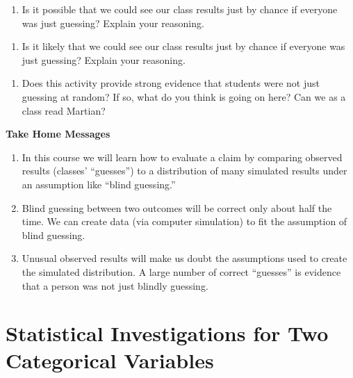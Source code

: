 \documentclass[
]{report}
\providecommand{\tightlist}{%
  \setlength{\itemsep}{0pt}\setlength{\parskip}{0pt}}
\begin{document}
\begin{enumerate}
\def\labelenumi{\arabic{enumi}.}
\setcounter{enumi}{15}
\tightlist
\item
  Is it possible that we could see our class results just by chance if everyone was just guessing? Explain your reasoning.
\end{enumerate}

\vspace{1in}

\begin{enumerate}
\def\labelenumi{\arabic{enumi}.}
\setcounter{enumi}{16}
\tightlist
\item
  Is it likely that we could see our class results just by chance if everyone was just guessing? Explain your reasoning.
\end{enumerate}

\vspace{1in}

\begin{enumerate}
\def\labelenumi{\arabic{enumi}.}
\setcounter{enumi}{17}
\tightlist
\item
  Does this activity provide strong evidence that students were not just guessing at random? If so, what do you think is going on here? Can we as a class read Martian?
\end{enumerate}

\vspace{1in}

\textbf{Take Home Messages}

\begin{enumerate}
\def\labelenumi{\arabic{enumi}.}
\item
  In this course we will learn how to evaluate a claim by comparing observed results (classes' ``guesses'') to a distribution of many simulated results under an assumption like ``blind guessing.''
\item
  Blind guessing between two outcomes will be correct only about half the time. We can create data (via computer simulation) to fit the assumption of blind guessing.
\item
  Unusual observed results will make us doubt the assumptions used to create the simulated distribution. A large number of correct ``guesses'' is evidence that a person was not just blindly guessing.
\end{enumerate}

\hypertarget{statistical-investigations-for-two-categorical-variables}{%
\chapter{Statistical Investigations for Two Categorical Variables}\label{statistical-investigations-for-two-categorical-variables}}
\end{document}
